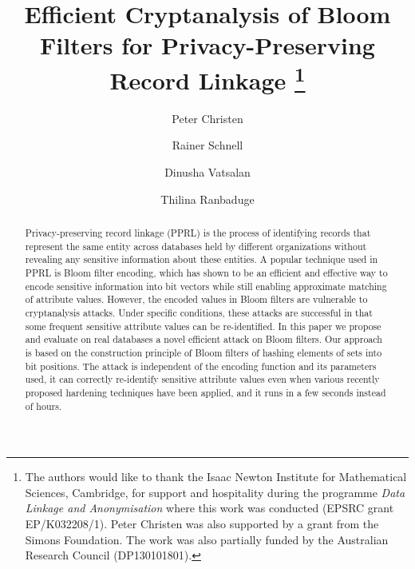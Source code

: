 \documentclass{llncs}
\begin{document}
\title{Efficient Cryptanalysis of Bloom Filters for
       Privacy-Preserving Record Linkage
  \thanks{The authors would like to thank the Isaac Newton Institute
  for Mathematical Sciences, Cambridge, for support and hospitality
  during the programme \emph{Data Linkage and Anonymisation} where
  this work was conducted (EPSRC grant EP/K032208/1). Peter Christen
  was also supported by a grant from the Simons Foundation. The work
  was also partially funded by the Australian Research Council
  (DP130101801).}}

\author{Peter Christen \and Rainer Schnell
        \and Dinusha Vatsalan \and Thilina
        Ranbaduge}

\maketitle

\begin{abstract}
Privacy-preserving record linkage (PPRL) is the process of identifying
records that represent the same entity across databases held by
different organizations without revealing any sensitive information
about these entities. A popular technique used in PPRL is Bloom
filter encoding, which has shown to be an efficient and effective way
to encode sensitive information into bit vectors while still enabling
approximate matching of attribute values. However, the encoded values
in Bloom filters are vulnerable to cryptanalysis attacks. Under
specific conditions, these attacks are successful in that some
frequent sensitive attribute values can be re-identified.
%
In this paper we propose and evaluate on real databases a novel
efficient attack on Bloom filters. Our approach is based on the
construction principle of Bloom filters of hashing elements of sets
into bit positions. The attack is independent of the encoding
function and its parameters used, it can correctly re-identify
sensitive attribute values even when various recently proposed
hardening techniques have been applied, and it runs in a few seconds
instead of hours.
\end{abstract}
\end{document}
